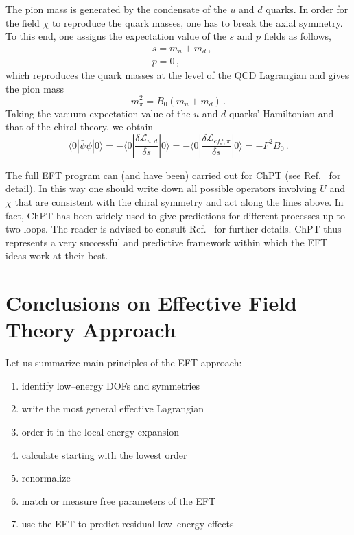 \documentclass[11pt,a4paper]{article}
\newcommand{\be}{\begin{equation}}
\newcommand{\ee}{\end{equation}}
\begin{document}
The pion mass is generated by the condensate of the $u$ and $d$ quarks.
In order for the field $\chi$
to reproduce the quark masses, one has to break the axial symmetry. To this end, one
assigns the expectation value of the $s$ and $p$ fields as follows,
\be
\begin{split}
&s=m_u+m_d\,,\\
&p=0\,,
 \end{split}
\ee
which reproduces the quark masses at the level of the QCD Lagrangian and
gives the pion mass
\be
m^2_\pi=
B_0(m_u+m_d)\,.
\ee
%
Taking the vacuum expectation value of the $u$ and $d$ quarks' Hamiltonian and that of the chiral theory, we obtain
\be
\langle 0| \bar \psi \psi |0\rangle =-\langle 0| \frac{\delta \mathcal{L}_{u,d}}{\delta s}|0\rangle =
-\langle 0| \frac{\delta \mathcal{L}_{eff,\pi}}{\delta s}|0\rangle
=-F^2 B_0\,.
\ee

The full EFT program can (and have been) carried out for ChPT (see  Ref.~\cite{Gasser:1984gg} for detail).
In this way one should write down all possible operators involving $U$ and $\chi$ that are consistent with the chiral symmetry and act along the lines above.
In fact, ChPT has been widely used to give predictions for different processes up to two loops.
The reader is advised to consult Ref.~\cite{Donoghue:1992dd} for further details.
ChPT thus represents a very successful and predictive framework within which the EFT ideas work at their best.

\section*{Conclusions on Effective Field Theory Approach}

Let us summarize main principles of the EFT approach:
\begin{enumerate}
\item identify low--energy DOFs and symmetries
\item write the most general effective Lagrangian
\item order it in the local energy expansion
\item calculate starting with the lowest order
\item renormalize
\item match or measure free parameters of the EFT
\item use the EFT to predict residual low--energy effects
\end{enumerate}
\end{document}
